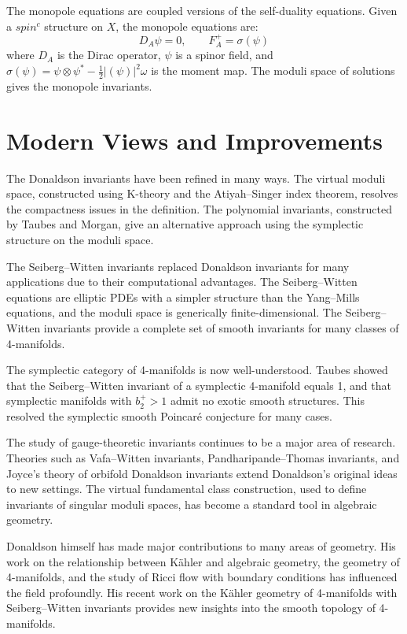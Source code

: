 The monopole equations are coupled versions of the self-duality equations. Given a $spin^c$ structure on $X$, the monopole equations are:
\[
D_A \psi = 0, \qquad F_A^+ = \sigma(\psi)
\]
where $D_A$ is the Dirac operator, $\psi$ is a spinor field, and $\sigma(\psi) = \psi \otimes \psi^* - \frac{1}{2}|(\psi)|^2 \omega$ is the moment map. The moduli space of solutions gives the monopole invariants.

\section{Modern Views and Improvements}

The Donaldson invariants have been refined in many ways. The virtual moduli space, constructed using K-theory and the Atiyah--Singer index theorem, resolves the compactness issues in the definition. The polynomial invariants, constructed by Taubes and Morgan, give an alternative approach using the symplectic structure on the moduli space.

The Seiberg--Witten invariants replaced Donaldson invariants for many applications due to their computational advantages. The Seiberg--Witten equations are elliptic PDEs with a simpler structure than the Yang--Mills equations, and the moduli space is generically finite-dimensional. The Seiberg--Witten invariants provide a complete set of smooth invariants for many classes of 4-manifolds.

The symplectic category of 4-manifolds is now well-understood. Taubes showed that the Seiberg--Witten invariant of a symplectic 4-manifold equals 1, and that symplectic manifolds with $b_2^+ > 1$ admit no exotic smooth structures. This resolved the symplectic smooth Poincar\'e conjecture for many cases.

The study of gauge-theoretic invariants continues to be a major area of research. Theories such as Vafa--Witten invariants, Pandharipande--Thomas invariants, and Joyce's theory of orbifold Donaldson invariants extend Donaldson's original ideas to new settings. The virtual fundamental class construction, used to define invariants of singular moduli spaces, has become a standard tool in algebraic geometry.

Donaldson himself has made major contributions to many areas of geometry. His work on the relationship between K\"ahler and algebraic geometry, the geometry of 4-manifolds, and the study of Ricci flow with boundary conditions has influenced the field profoundly. His recent work on the K\"ahler geometry of 4-manifolds with Seiberg--Witten invariants provides new insights into the smooth topology of 4-manifolds.

